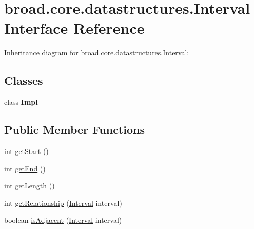 \hypertarget{interfacebroad_1_1core_1_1datastructures_1_1_interval}{\section{broad.\+core.\+datastructures.\+Interval Interface Reference}
\label{interfacebroad_1_1core_1_1datastructures_1_1_interval}
}


Inheritance diagram for broad.\+core.\+datastructures.\+Interval\+:
\subsection*{Classes}
\begin{DoxyCompactItemize}
\item 
class {\bfseries Impl}
\end{DoxyCompactItemize}
\subsection*{Public Member Functions}
\begin{DoxyCompactItemize}
\item 
int \hyperlink{interfacebroad_1_1core_1_1datastructures_1_1_interval_a3ae69808c01e3b50765b22724f18fe14}{get\+Start} ()
\item 
int \hyperlink{interfacebroad_1_1core_1_1datastructures_1_1_interval_a3ecab556a0bfd0b97a7ff64fe875f546}{get\+End} ()
\item 
int \hyperlink{interfacebroad_1_1core_1_1datastructures_1_1_interval_a96afcf6952ec287be3ee66d9dde58d75}{get\+Length} ()
\item 
int \hyperlink{interfacebroad_1_1core_1_1datastructures_1_1_interval_a630b2eae8e23cd00c870f4f3b51303c5}{get\+Relationship} (\hyperlink{interfacebroad_1_1core_1_1datastructures_1_1_interval}{Interval} interval)
\item 
boolean \hyperlink{interfacebroad_1_1core_1_1datastructures_1_1_interval_afd44cbd67e804688cac81aa094bdce1d}{is\+Adjacent} (\hyperlink{interfacebroad_1_1core_1_1datastructures_1_1_interval}{Interval} interval)
\end{DoxyCompactItemize}
